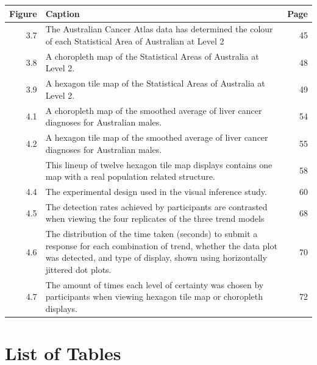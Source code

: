 \documentclass{monashthesis}
\begin{document}
\begin{tabular}{r>{\raggedright\arraybackslash}p{30em}r}
\toprule
Figure & Caption & Page\\
\midrule
3.7 & The Australian Cancer Atlas data has determined the colour of each Statistical Area of Australian at Level 2 & 45\\
3.8 & A choropleth map of the Statistical Areas of Australia at Level 2. & 48\\
3.9 & A hexagon tile map of the Statistical Areas of Australia at Level 2. & 49\\
4.1 & A choropleth map of the smoothed average of liver cancer diagnoses for Australian males. & 54\\
4.2 & A hexagon tile map of the smoothed average of liver cancer diagnoses for Australian males. & 55\\
\addlinespace
4.3 & This lineup of twelve hexagon tile map displays contains one map with a real population related structure. & 58\\
4.4 & The experimental design used in the visual inference study. & 60\\
4.5 & The detection rates achieved by participants are contrasted when viewing the four replicates of the three trend models & 68\\
4.6 & The distribution of the time taken (seconds) to submit a response for each combination of trend, whether the data plot was detected, and type of display, shown using horizontally jittered dot plots. & 70\\
4.7 & The amount of times each level of certainty was chosen by participants when viewing hexagon tile map or choropleth displays. & 72\\
\bottomrule
\end{tabular}

\hypertarget{list-of-tables}{%
\chapter*{List of Tables}\label{list-of-tables}}
\end{document}
